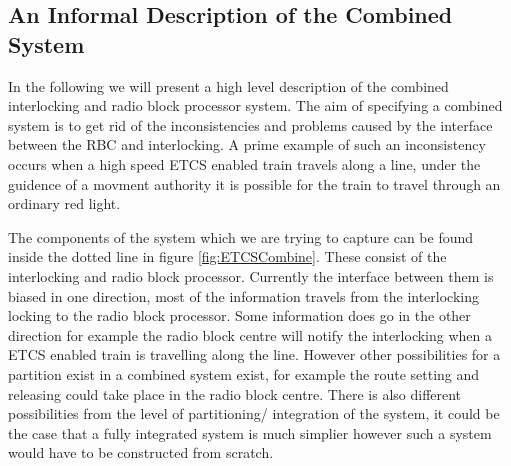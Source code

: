 \subsection*{An Informal Description of the Combined System}
In the following we will present a high level description of the combined interlocking and radio block processor system.
The aim of specifying a combined system is to get rid of the inconsistencies and problems caused by the interface between the RBC and interlocking. A prime example of such an inconsistency occurs when a high speed ETCS enabled train travels along a line, under the guidence of a movment authority it is possible for the train to travel through an ordinary red light.  

 The components of the system which we are trying to capture can be found inside the dotted line in figure \ref{fig:ETCSCombine}. These consist of the interlocking and radio block processor. Currently the interface between them is biased in one direction, most of the information travels from the interlocking locking to the radio block processor. Some information does go in the other direction for example the radio block centre will notify the interlocking when a ETCS enabled train is travelling along the line.  However other possibilities for a partition exist in a combined system exist, for example the route setting and releasing could take place in the radio block centre. There is also different possibilities from the level of partitioning/ integration of the system, it could be the case that a fully integrated system is much simplier however such a system would have to be constructed from scratch. 



